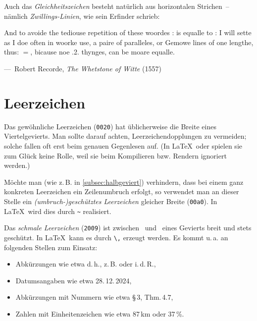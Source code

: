 Auch das \emph{Gleichheitszeichen} \Char{$=$} besteht natürlich aus horizontalen
Strichen~-- nämlich \emph{Zwillings-Linien}, wie sein Erfinder
 schrieb:
\begin{displayquote}
  \foreignlanguage{british}{And to avoide the tediouse repetition of
    these woordes : is equalle to : I will sette as I doe often in
    woorke use, a paire of paralleles, or Gemowe lines of one lengthe,
    thus: $=$, bicause noe .2. thynges, can be moare equalle.}

  \quad---~Robert Recorde, \emph{The Whetstone of Witte} (1557)
\end{displayquote}




\section{Leerzeichen}

Das gewöhnliche Leerzeichen (\texttt{0020}) hat üblicherweise die Breite eines
Viertelgevierts. Man sollte darauf achten, Leerzeichendopplungen zu vermeiden;
solche fallen oft erst beim genauen Gegenlesen auf. (In \LaTeX\ oder 
spielen sie zum Glück keine Rolle, weil sie beim Kompilieren bzw. Rendern
ignoriert werden.)

Möchte man (wie z.\,B. in \cref{subsec:halbgeviert}) verhindern, dass bei einem
ganz konkreten Leerzeichen ein Zeilenumbruch erfolgt, so verwendet man an dieser
Stelle ein \emph{(umbruch-)geschütztes Leerzeichen} gleicher Breite
(\texttt{00a0}). In \LaTeX\ wird dies durch \verb!~! realisiert.

Das \emph{schmale Leerzeichen} (\texttt{2009}) ist zwischen \ und
\ eines Gevierts breit und stets geschützt. In \LaTeX\ kann
es durch \verb!\,! erzeugt werden. Es kommt u.\,a. an folgenden Stellen zum Einsatz:
\begin{itemize}[nosep]
\item Abkürzungen wie etwa d.\,h., z.\,B. oder i.\,d.\,R.,
\item Datumsangaben wie etwa 28.\,12.\,2024,
\item Abkürzungen mit Nummern wie etwa §\,3, Thm.\,4.7,
\item Zahlen mit Einheitenzeichen wie etwa 87\,km oder 37\,\%.
\end{itemize}

